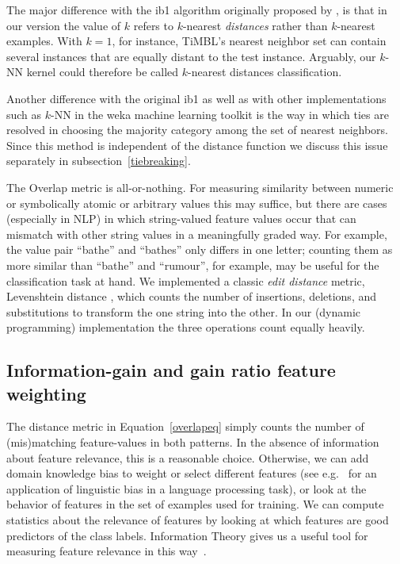 \documentclass{report}
\begin{document}
The major difference with the {\sc ib1} algorithm originally proposed
by \cite{Aha+91}, is that in our version the value of $k$ refers to
$k$-nearest {\em distances}\/ rather than $k$-nearest examples. With
$k=1$, for instance, TiMBL's nearest neighbor set can contain several
instances that are equally distant to the test instance. Arguably, our
$k$-NN kernel could therefore be called $k$-nearest distances
classification.

Another difference with the original {\sc ib1} as well as with other
implementations such as $k$-NN in the {\sc weka} machine learning
toolkit \cite{Witten+99} is the way in which ties are resolved in
choosing the majority category among the set of nearest
neighbors. Since this method is independent of the distance function
we discuss this issue separately in subsection~\ref{tiebreaking}.

The Overlap metric is all-or-nothing. For measuring similarity between
numeric or symbolically atomic or arbitrary values this may suffice,
but there are cases (especially in NLP) in which string-valued feature
values occur that can mismatch with other string values in a
meaningfully graded way. For example, the value pair ``bathe'' and
``bathes'' only differs in one letter; counting them as more similar
than ``bathe'' and ``rumour'', for example, may be useful for the
classification task at hand. We implemented a classic {\em edit
  distance}\/ metric, Levenshtein distance \cite{Levenshtein66}, which
counts the number of insertions, deletions, and substitutions to
transform the one string into the other. In our (dynamic programming)
implementation the three operations count equally heavily.

\subsection{Information-gain and gain ratio feature weighting}
\label{infogain}

The distance metric in Equation~\ref{overlapeq} simply counts the
number of (mis)matching feature-values in both patterns. In the
absence of information about feature relevance, this is a reasonable
choice. Otherwise, we can add domain knowledge bias to weight or
select different features (see e.g.~ for an
application of linguistic bias in a language processing task), or look
at the behavior of features in the set of examples used for
training. We can compute statistics about the relevance of features by
looking at which features are good predictors of the class
labels. Information Theory gives us a useful tool for measuring
feature relevance in this way~\cite{Quinlan86,Quinlan93}.
\end{document}
